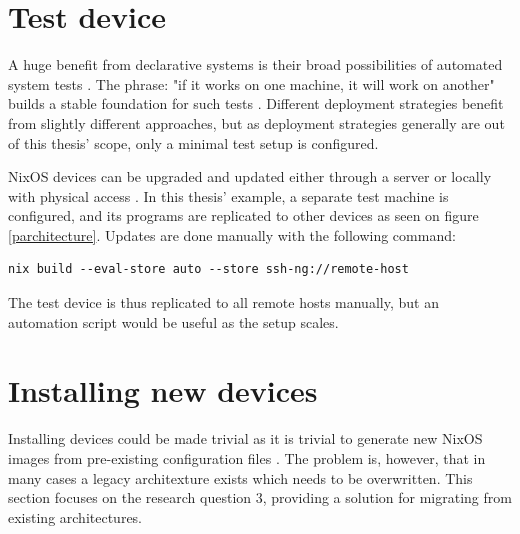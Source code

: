 \section{Test device}

A huge benefit from declarative systems is their broad possibilities
of automated system tests \cite{van2010automating}. The phrase: "if it
works on one machine, it will work on another" builds a stable
foundation for such tests \cite{nixosNixOSManual}. Different
deployment strategies benefit from slightly different approaches, but
as deployment strategies generally are out of this thesis' scope, only
a minimal test setup is configured.

NixOS devices can be upgraded and updated either through a server or locally
with physical access \cite{nixosNixOSManual}. In this thesis' example,
a separate test machine is configured, and its programs are
replicated to other devices as seen on figure
\ref{parchitecture}. Updates are done manually with the following command:

\begin{lstlisting}
nix build --eval-store auto --store ssh-ng://remote-host
\end{lstlisting}

The test device is thus replicated to all remote hosts manually, but
an automation script would be useful as the setup scales.

\section{Installing new devices} \label{instnewdevices}

Installing devices could be made trivial as it is trivial to generate new
NixOS images from pre-existing configuration files
\cite{nixosNixOSManual}. The problem is, however, that in many cases a
legacy architexture exists which needs to be overwritten. This
section focuses on the research question 3, providing a solution for
migrating from existing architectures.

